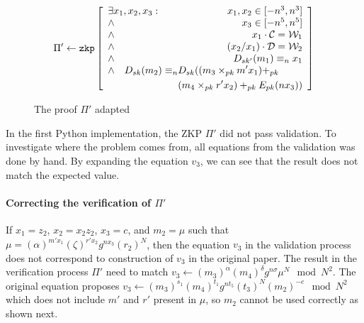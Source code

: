 \begin{figure}[h]
    \begin{table}[H]
      \centering
      \begin{footnotesize}
        \[
        \Pi' \leftarrow \texttt{zkp} \begin{bmatrix}\begin{array}{lr}
                                          \exists x_1, x_2, x_3 : & x_1, x_2 \in [-n^3, n^3] \\
                                          \land & x_3 \in [-n^5, n^5] \\
                                          \land & x_1 \cdot \mathcal{C} = \mathcal{W}_1 \\
                                          \land & (x_2/x_1) \cdot \mathcal{D} = \mathcal{W}_2 \\
                                          \land & D_{sk'}(m_1) \equiv_n x_1 \\
                                          \multicolumn{2}{l}{
                                            \begin{aligned}[t]
                                                \land \quad D_{sk}(m_2) \equiv_n & D_{sk}((m_3 \times_{pk} m'x_1) +_{pk} \\
                                                                                 & (m_4 \times_{pk} r'x_2) +_{pk} E_{pk}(nx_3))
                                              \end{aligned}
                                          }
                                         \end{array}\end{bmatrix}
        \]
      \end{footnotesize}
    \end{table}

  \caption{The proof $\Pi'$ adapted}
  \label{fig:theProofPi2}
\end{figure}

In the first Python implementation, the ZKP $\Pi'$ did not pass validation.
To investigate where the problem comes from, all equations from the validation
was done by hand. By expanding the equation $v_3$, we can see that the result
does not match the expected value.

\paragraph{Correcting the verification of $\Pi'$}
If $x_1 = z_2$, $x_2 = x_2 z_2$, $x_3 = c$, and $m_2 = \mu$ such that $\mu =
(\alpha)^{m' x_1} (\zeta)^{r' x_2} g^{nx_3} (r_2)^{N}$, then the equation $v_3$
in the validation process does not correspond to construction of $v_3$ in the
original paper. The result in the verification process $\Pi'$ need to match
$v_3 \leftarrow (m_3)^{\alpha} (m_4)^{\delta} g^{n \sigma} \mu^{N} \mod N^2$.
The original equation proposes $v_3 \leftarrow (m_3)^{s_1} (m_4)^{t_1} g^{nt_5}
(t_3)^{N} (m_2)^{-e} \mod N^2$ which does not include $m'$ and $r'$ present in $\mu$,
so $m_2$ cannot be used correctly as shown next.

